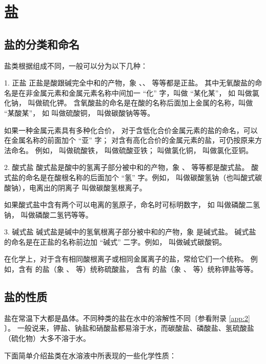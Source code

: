 \section{盐}\label{sec:5-6}

\subsection{盐的分类和命名}

盐类根据组成不同，一般可以分为以下几种：

1. 正盐 \quad 正盐是酸跟碱完全中和的产物，象  、、  等等都是正盐。
其中无氧酸盐的命名是在非金属元素和金属元素名称中间加一 “化” 字，叫做 “某化某”，
如  叫做氯化钠，  叫做硫化钾。
含氧酸盐的命名是在酸的名称后面加上金属的名称，叫做 “某酸某”，
如  叫做硫酸铜， 叫做碳酸钠等等。

如果一种金属元素具有多种化合价，
对于含低化合价金属元素的盐的命名，可以在金属名称的前面加个 “亚” 字；
对含有高化合价的金属元素的盐，可仍按原来方法命名。
例如，  叫做硫酸铁，  叫做硫酸亚铁；
 叫做氯化铜，  叫做氯化亚铜。


2. 酸式盐 \quad 酸式盐是酸中的氢离子部分被中和的产物，象 、  等等都是酸式盐。
酸式盐的命名是在酸根名称的后面加个 “氢” 字。例如，
 叫做碳酸氢钠（也叫酸式碳酸钠），电离出的阴离子  叫做碳酸氢根离子。

如果酸式盐中含有两个可以电离的氢原子，命名时可标明数字，
如  叫做磷酸二氢钠，  叫做磷酸二氢钙等等。

3. 碱式盐 \quad 碱式盐是碱中的氢氧根离子部分被中和的产物，象  是碱式盐。
碱式盐的命名是在正盐的名称前边加 “碱式” 二字。例如，
 叫做碱式碳酸铜。

在化学上，对于含有相同酸根离子或相同金属离子的盐，常给它们一个统称。
例如，含有  的盐（象 、  等）统称硫酸盐，
含有  的盐（象 、  等）统称钾盐等等。


\subsection{盐的性质}

盐在常温下大都是晶体。不同种类的盐在水中的溶解性不同〔参看附录 \ref{app:2} \quad {}〕。
一般说来，钾盐、钠盐和硝酸盐都易溶于水，而碳酸盐、磷酸盐、氢硫酸盐（硫化物）大多不溶于水。

下面简单介绍盐类在水溶液中所表现的一些化学性质：


